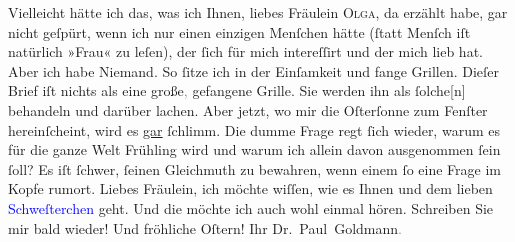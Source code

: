 \pstart
           Vielleicht hätte ich das, was ich Ihnen, liebes Fräulein \textsc{Olga}, da erzählt habe, gar nicht geſpürt, wenn ich \strikeout{\textcolor{gray}{×}} nur einen einzigen Menſchen hätte (ſtatt Menſch iſt natürlich »Frau« zu
               leſen), der ſich für mich intereſſirt und der mich lieb hat. Aber ich habe {\pb}Niemand. So ſitze ich in der Einſamkeit und fange
               Grillen. Dieſer Brief iſt nichts als eine große\textcolor{gray}{,} gefangene Grille.
               Sie werden ihn als ſolche{[}n{]} behandeln und darüber lachen. Aber
               jetzt, wo mir die Oſterſonne zum Fenſter
               hereinſcheint, wird es \uline{gar} ſchlimm. Die dumme Frage
               regt ſich wieder, warum es für die ganze Welt Frühling wird und warum ich allein
               davon ausgenommen ſein ſoll? Es iſt ſchwer, ſeinen Gleichmuth zu bewahren, wenn einem
               ſo eine Frage im Kopfe rumort.\pend
           \pstart Liebes Fräulein, ich möchte wiſſen, wie es Ihnen und dem lieben \textcolor{blue}{Schweſterchen}{}\ledrightnote{{$\rightarrow$}\textcolor{blue}{Elisabeth Steinrück}} geht. Und die
                  \label{K_L03524-4v}\label{K_L03524-4h} möchte ich auch wohl einmal hören. Schreiben Sie mir bald wieder!
               Und fröhliche Oſtern! Ihr \spacefill\mbox{Dr. Paul
                     Goldmann\textcolor{gray}{.}}\pend{}
\pstart
           \noindent{}{\pb}\label{T_L03524-2v}\label{T_L03524-2h}\pend
           \endnumbering{}  
      